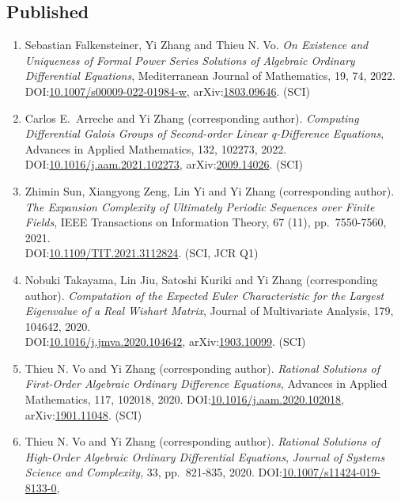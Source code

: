 \documentclass[a4paper,12pt]{article}
\begin{document}
\subsection*{Published}
\begin{enumerate}
\item Sebastian Falkensteiner, Yi Zhang and Thieu N. Vo. 
{\em On Existence and Uniqueness of Formal Power Series Solutions of Algebraic Ordinary
     Differential Equations},  Mediterranean Journal of Mathematics, 19, 74, 2022. \\
DOI:\href{https://doi.org/10.1007/s00009-022-01984-w}{10.1007/s00009-022-01984-w}, 
arXiv:\href{https://arxiv.org/abs/1803.09646}{1803.09646}. (SCI) 
\item Carlos E.\ Arreche and Yi Zhang (corresponding author). 
{\em Computing Differential Galois Groups of Second-order Linear q-Difference Equations}, Advances in Applied Mathematics, 132, 102273, 2022. 
DOI:\href{https://doi.org/10.1016/j.aam.2021.102273}{10.1016/j.aam.2021.102273}, 
arXiv:\href{https://arxiv.org/abs/2009.14026}{2009.14026}. (SCI)
\item Zhimin Sun,  Xiangyong Zeng, Lin Yi and Yi Zhang (corresponding author). 
{\em The Expansion Complexity of Ultimately Periodic Sequences over Finite Fields},  IEEE Transactions on Information Theory, 67 (11), pp.\ 7550-7560, 2021. \\ 
DOI:\href{https://doi.org/10.1109/TIT.2021.3112824}{10.1109/TIT.2021.3112824}. (SCI, JCR Q1)
 \item Nobuki Takayama, Lin Jiu, Satoshi Kuriki and Yi Zhang (corresponding author). 
 {\em Computation of the Expected Euler Characteristic for the Largest Eigenvalue of a Real Wishart Matrix}, Journal of Multivariate Analysis, 179, 104642, 2020. \\
 DOI:\href{https://doi.org/10.1016/j.jmva.2020.104642}{10.1016/j.jmva.2020.104642}, 
 arXiv:\href{http://arxiv.org/abs/1903.10099}{1903.10099}. (SCI)
 \item Thieu N. Vo and Yi Zhang (corresponding author). 
{\em Rational Solutions of First-Order Algebraic Ordinary Difference Equations},  Advances in Applied Mathematics, 117, 102018, 2020. 
DOI:\href{https://doi.org/10.1016/j.aam.2020.102018}{10.1016/j.aam.2020.102018},
arXiv:\href{http://arxiv.org/abs/1901.11048}{1901.11048}. (SCI)
 \item Thieu N. Vo and Yi Zhang (corresponding author). {\em Rational Solutions of High-Order Algebraic Ordinary Differential Equations},  {\em Journal of Systems Science and Complexity}, 33, pp.\ 821-835, 2020. DOI:\href{https://link.springer.com/article/10.1007/s11424-019-8133-0}{10.1007/s11424-019-8133-0}, \\

\end{enumerate}
\end{document}
